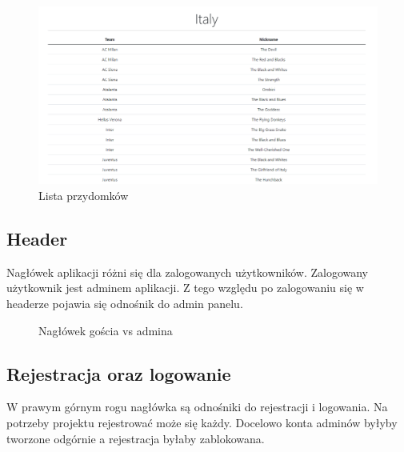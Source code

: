 \documentclass[]{article}
\begin{document}
\begin{figure}[H]
	\centering
	\includegraphics[scale=0.39]{nicknames-view}
	\caption{Lista przydomków}
\end{figure}

\subsection{Header} \label{header}
Nagłówek aplikacji różni się dla zalogowanych użytkowników. Zalogowany użytkownik jest adminem aplikacji. Z tego względu po zalogowaniu się w headerze pojawia się odnośnik do admin panelu.

\begin{figure}[H]%
	\centering
	\qquad
	\caption{Nagłówek gościa vs admina}%
\end{figure}

\subsection{Rejestracja oraz logowanie}
W prawym górnym rogu nagłówka są odnośniki do rejestracji i logowania. Na potrzeby projektu rejestrować może się każdy. Docelowo konta adminów byłyby tworzone odgórnie a rejestracja byłaby zablokowana.
\end{document}
